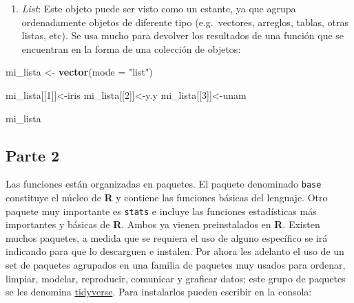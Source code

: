 \documentclass[
]{article}
\newenvironment{Shaded}{\begin{snugshade}}{\end{snugshade}}
\newcommand{\DataTypeTok}[1]{\textcolor[rgb]{0.13,0.29,0.53}{#1}}
\newcommand{\DecValTok}[1]{\textcolor[rgb]{0.00,0.00,0.81}{#1}}
\newcommand{\KeywordTok}[1]{\textcolor[rgb]{0.13,0.29,0.53}{\textbf{#1}}}
\newcommand{\NormalTok}[1]{#1}
\newcommand{\StringTok}[1]{\textcolor[rgb]{0.31,0.60,0.02}{#1}}
\providecommand{\tightlist}{%
  \setlength{\itemsep}{0pt}\setlength{\parskip}{0pt}}
\begin{document}
\begin{enumerate}
\def\labelenumi{\Alph{enumi})}
\setcounter{enumi}{4}
\tightlist
\item
  \emph{List}: Este objeto puede ser visto como un estante, ya que
  agrupa ordenadamente objetos de diferente tipo (e.g.~vectores,
  arreglos, tablas, otras listas, etc). Se usa mucho para devolver los
  resultados de una función que se encuentran en la forma de una
  colección de objetos:
\end{enumerate}

\begin{Shaded}
\begin{Highlighting}[]
\NormalTok{mi_lista <-}\StringTok{ }\KeywordTok{vector}\NormalTok{(}\DataTypeTok{mode =} \StringTok{"list"}\NormalTok{)}

\NormalTok{mi_lista[[}\DecValTok{1}\NormalTok{]]<-iris}
\NormalTok{mi_lista[[}\DecValTok{2}\NormalTok{]]<-y.y}
\NormalTok{mi_lista[[}\DecValTok{3}\NormalTok{]]<-unam}

\NormalTok{mi_lista}
\end{Highlighting}
\end{Shaded}

\hypertarget{parte-2}{%
\subsection{Parte 2}\label{parte-2}}

Las funciones están organizadas en paquetes. El paquete denominado
\texttt{base} constituye el núcleo de \textbf{R} y contiene las
funciones básicas del lenguaje. Otro paquete muy importante es
\texttt{stats} e incluye las funciones estadísticas más importantes y
básicas de \textbf{R}. Ambos ya vienen preinstalados en \textbf{R}.
Existen muchos paquetes, a medida que se requiera el uso de alguno
específico se irá indicando para que lo descarguen e instalen. Por ahora
les adelanto el uso de un set de paquetes agrupados en una familia de
paquetes muy usados para ordenar, limpiar, modelar, reproducir,
comunicar y graficar datos; este grupo de paquetes se les denomina
\href{https://www.tidyverse.org/}{tidyverse}. Para instalarlos pueden
escribir en la consola:
\end{document}

